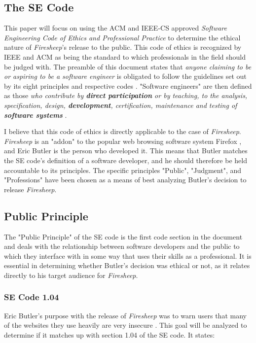 \documentclass[11pt]{article}
\begin{document}
\begin{multicols}{2}
\subsection{The SE Code}
This paper will focus on using the ACM and IEEE-CS approved \emph{Software Engineering Code of Ethics and Professional Practice} \cite{se_code} to determine the ethical nature of \emph{Firesheep}'s release to the public. This code of ethics is recognized by IEEE and ACM as being the standard to which professionals in the field should be judged with. The preamble of this document states that \emph{anyone claiming to be or aspiring to be a software engineer} is obligated to follow the guidelines set out by its eight principles and respective codes \cite{se_code}. "Software engineers" are then defined as those \emph{who contribute by \textbf{direct participation} or by teaching, to the analysis, specification, design, \textbf{development}, certification, maintenance and testing of \textbf{software systems}} \cite{se_code}.

I believe that this code of ethics is directly applicable to the case of \emph{Firesheep}. \emph{Firesheep} is an "addon" to the popular web browsing software system Firefox \cite{codebutler_main}, and Eric Butler is the person who developed it. This means that Butler matches the SE code's definition of a software developer, and he should therefore be held accountable to its principles. The specific principles "Public", "Judgment", and "Professions" have been chosen as a means of best analyzing Butler's decision to release \emph{Firesheep}.

\subsection{Public Principle}
The "Public Principle" of the SE code is the first code section in the document and deals with the relationship between software developers and the public to which they interface with in some way that uses their skills as a professional. It is essential in determining whether Butler's decision was ethical or not, as it relates directly to his target audience for \emph{Firesheep}.

\subsubsection{SE Code 1.04}
Eric Butler's purpose with the release of \emph{Firesheep} was to warn users that many of the websites they use heavily are very insecure \cite{codebutler_main} \cite{toorcon_slides}. This goal will be analyzed to determine if it matches up with section 1.04 of the SE code. It states:


\end{multicols}
\end{document}
